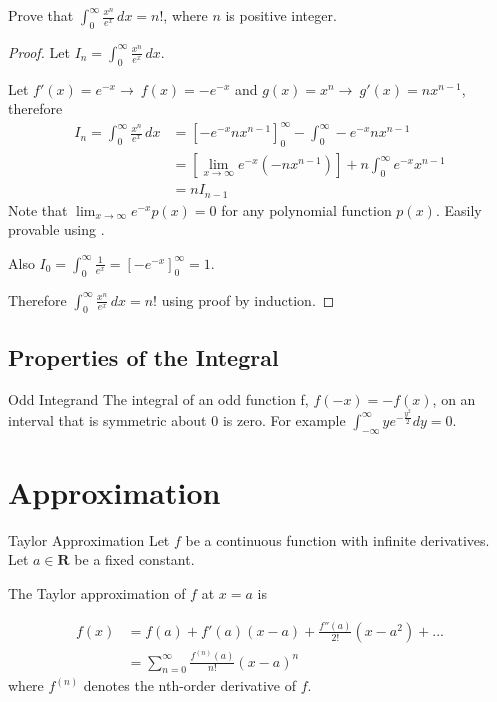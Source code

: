 \documentclass[11pt,a4paper,fleqn]{article}
\numberwithin{equation}{section}
\newcommand{\g}{$\rightarrow\ $}
\begin{document}
\begin{exec}
    Prove that $\int_{0}^{\infty}\frac{x^n}{e^{x}}\,dx = n!$, where $n$ is positive integer.
    \tcblower
    \begin{proof}
        Let $I_n = \int_{0}^{\infty}\frac{x^n}{e^{x}}\,dx$.
        
        Let $f'(x)=e^{-x}$\g$f(x)=-e^{-x}$ and $g(x)=x^n$\g$g'(x)=nx^{n-1}$, therefore
        \begin{align*}
            I_n = \int_{0}^{\infty}\frac{x^n}{e^{x}}\,dx
            &= \left[-e^{-x}nx^{n-1}\right]^{\infty}_{0} - \int_{0}^{\infty}-e^{-x}nx^{n-1} \\
            &= \left[\lim_{x\rightarrow\infty}e^{-x}(-nx^{n-1})\right] + n\int_{0}^{\infty}e^{-x}x^{n-1} \\
            &= nI_{n-1}
        \end{align*}
        Note that $\lim_{x\rightarrow\infty}e^{-x}p(x)=0$ for any polynomial function $p(x)$. Easily provable using .
        
        Also $I_{0}=\int^{\infty}_{0}\frac{1}{e^x}=\left[-e^{-x}\right]^{\infty}_{0}=1$.
        
        Therefore $\int_{0}^{\infty}\frac{x^n}{e^{x}}\,dx=n!$ using proof by induction.
    \end{proof}
\end{exec}

\subsection{Properties of the Integral}

\begin{fact}{Odd Integrand}{}
    The integral of an odd function f, $f(-x)=-f(x)$, on an interval that is symmetric about 0 is zero. For example $\int_{-\infty}^{\infty} ye^{-\frac{y^2}{2}}dy=0$.
\end{fact}

\section{Approximation}
\begin{fact}{Taylor Approximation}{}
    Let $f$ be a continuous function with infinite derivatives.
    Let $a\in \textbf{R}$ be a fixed constant.
    
    The Taylor approximation of $f$ at $x=a$ is
    
    \begin{align}
        f(x) &= f(a) + f'(a)(x-a) + \frac{f''(a)}{2!}(x-a^2)+...\\
        &= \sum^{\infty}_{n=0}\frac{f^{(n)}(a)}{n!}(x-a)^n
    \end{align}
    where $f^{(n)}$ denotes the nth-order derivative of $f$.
\end{fact}
\end{document}
